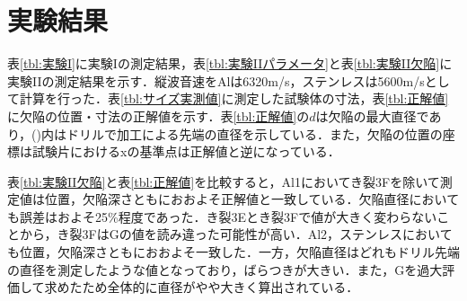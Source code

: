 \section{実験結果}

表\ref{tbl:実験I}に実験Iの測定結果，表\ref{tbl:実験IIパラメータ}と表\ref{tbl:実験II欠陥}に実験IIの測定結果を示す．縦波音速をAlは6320m/s，ステンレスは5600m/sとして計算を行った．表\ref{tbl:サイズ実測値}に測定した試験体の寸法，表\ref{tbl:正解値}に欠陥の位置・寸法の正解値を示す．表\ref{tbl:正解値}の$d$は欠陥の最大直径であり，()内はドリルで加工による先端の直径を示している．また，欠陥の位置の座標は試験片におけるxの基準点は正解値と逆になっている．

表\ref{tbl:実験II欠陥}と表\ref{tbl:正解値}を比較すると，Al1においてき裂3Fを除いて測定値は位置，欠陥深さともにおおよそ正解値と一致している．欠陥直径においても誤差はおよそ25\%程度であった．き裂3Eとき裂3Fで値が大きく変わらないことから，き裂3FはGの値を読み違った可能性が高い．Al2，ステンレスにおいても位置，欠陥深さともにおおよそ一致した．一方，欠陥直径はどれもドリル先端の直径を測定したような値となっており，ばらつきが大きい．また，Gを過大評価して求めたため全体的に直径がやや大きく算出されている．

\begin{table}[htbp]
    \centering
    \caption{Measurement results of Experiment I.}
    \label{tbl:実験I}
\end{table}


